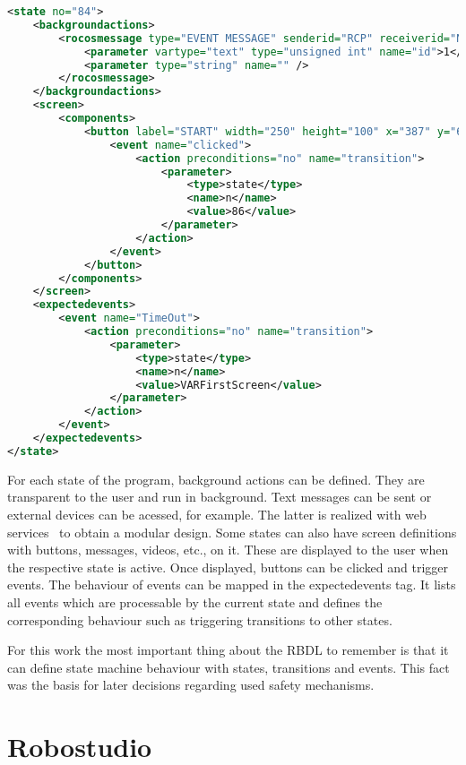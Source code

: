 \begin{lstlisting}[float = htbp, language=XML, captionpos=b, breaklines=true, showspaces=false, showtabs=false, tabsize=2, caption=Example of a state defined by RBDL~\cite{robostudio}., label=lst:RBDL]
<state no="84">
	<backgroundactions>
		<rocosmessage type="EVENT MESSAGE" senderid="RCP" receiverid="NA" name="FDSessionStart">
			<parameter vartype="text" type="unsigned int" name="id">1</parameter>
			<parameter type="string" name="" />
		</rocosmessage>
	</backgroundactions>
	<screen>
		<components>
			<button label="START" width="250" height="100" x="387" y="600" textsize="40">
				<event name="clicked">
					<action preconditions="no" name="transition">
						<parameter>
							<type>state</type>
							<name>n</name>
							<value>86</value>
						</parameter>
					</action>
				</event>
			</button>
		</components>
	</screen>
	<expectedevents>
		<event name="TimeOut">
			<action preconditions="no" name="transition">
				<parameter>
					<type>state</type>
					<name>n</name>
					<value>VARFirstScreen</value>
				</parameter>
			</action>
		</event>
	</expectedevents>
</state>
\end{lstlisting}

For each state of the program, background actions can be defined. They are transparent to the user and run in background. Text messages can be sent or external devices can be acessed, for example. The latter is realized with web services~\cite{webservices} to obtain a modular design.
Some states can also have screen definitions with buttons, messages, videos, etc., on it. These are displayed to the user when the respective state is active. Once displayed, buttons can be clicked and trigger events.
The behaviour of events can be mapped in the expectedevents tag. It lists all events which are processable by the current state and defines the corresponding behaviour such as triggering transitions to other states.

For this work the most important thing about the RBDL to remember is that it can define state machine behaviour with states, transitions and events. This fact was the basis for later decisions regarding used safety mechanisms.







\section{Robostudio}
\label{sec:robostudio}

